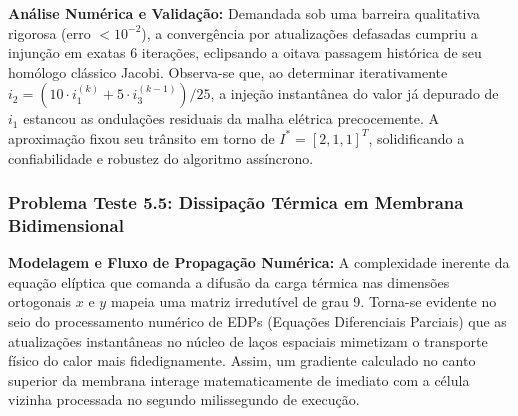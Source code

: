 \textbf{Análise Numérica e Validação:} Demandada sob uma barreira qualitativa rigorosa (erro $< 10^{-2}$), a convergência por atualizações defasadas cumpriu a injunção em exatas 6 iterações, eclipsando a oitava passagem histórica de seu homólogo clássico Jacobi. Observa-se que, ao determinar iterativamente $i_2 = (10 \cdot i_1^{(k)} + 5 \cdot i_3^{(k-1)})/25$, a injeção instantânea do valor já depurado de $i_1$ estancou as ondulações residuais da malha elétrica precocemente. A aproximação fixou seu trânsito em torno de $I^* = [2, 1, 1]^T$, solidificando a confiabilidade e robustez do algoritmo assíncrono.

\subsubsection{Problema Teste 5.5: Dissipação Térmica em Membrana Bidimensional}

\textbf{Modelagem e Fluxo de Propagação Numérica:} A complexidade inerente da equação elíptica que comanda a difusão da carga térmica nas dimensões ortogonais $x$ e $y$ mapeia uma matriz irredutível de grau 9. Torna-se evidente no seio do processamento numérico de EDPs (Equações Diferenciais Parciais) que as atualizações instantâneas no núcleo de laços espaciais mimetizam o transporte físico do calor mais fidedignamente. Assim, um gradiente calculado no canto superior da membrana interage matematicamente de imediato com a célula vizinha processada no segundo milissegundo de execução.

\begin{table}[H]
\centering
\caption{Convergência Espacial Acelerada do Campo}
\label{tab:seidel_prob55}
\end{table}

